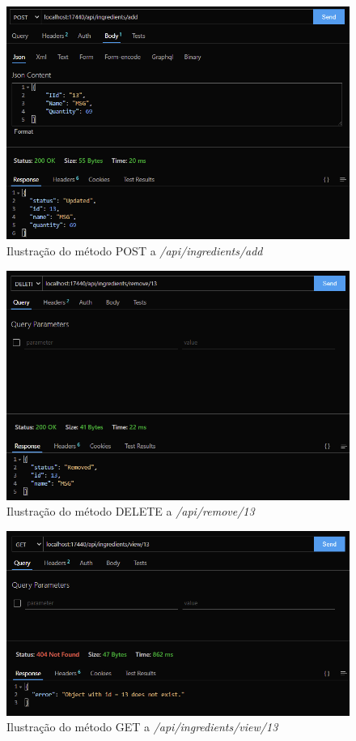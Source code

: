 \begin{figure}[!hbt]
    \centering
    \includegraphics[width=14cm]{Resources/API/Ingredients/Ingredients (1).png}
    \caption{Ilustração do método POST a \textit{/api/ingredients/add}}
    
\end{figure}
\FloatBarrier
\begin{figure}[!hbt]
    \centering
    \includegraphics[width=14cm]{Resources/API/Ingredients/Ingredients (2).png}
    \caption{Ilustração do método DELETE a \textit{/api/remove/13}}
    
\end{figure}
\FloatBarrier
\begin{figure}[!hbt]
    \centering
    \includegraphics[width=14cm]{Resources/API/Ingredients/Ingredients (3).png}
    \caption{Ilustração do método GET a \textit{/api/ingredients/view/13}}
    
\end{figure}
